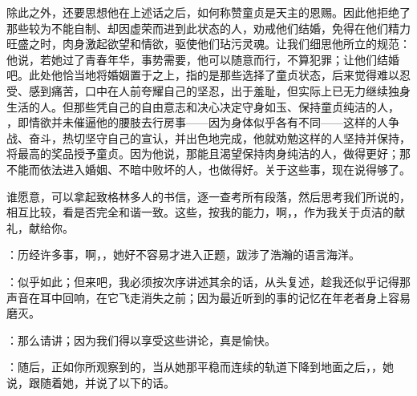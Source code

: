 除此之外，还要思想他在上述话之后，如何称赞童贞是天主的恩赐。因此他拒绝了那些较为不能自制、却因虚荣而进到此状态的人，劝戒他们结婚，免得在他们精力旺盛之时，肉身激起欲望和情欲，驱使他们玷污灵魂。让我们细思他所立的规范：他说，若她过了青春年华，事势需要，他可以随意而行，不算犯罪；让他们结婚吧。此处他恰当地将婚姻置于之上，指的是那些选择了童贞状态，后来觉得难以忍受、感到痛苦，口中在人前夸耀自己的坚忍，出于羞耻，但实际上已无力继续独身生活的人。但那些凭自己的自由意志和决心决定守身如玉、保持童贞纯洁的人，  ，即情欲并未催逼他的腰肢去行房事——因为身体似乎各有不同——这样的人争战、奋斗，热切坚守自己的宣认，并出色地完成，他就劝勉这样的人坚持并保持，将最高的奖品授予童贞。因为他说，那能且渴望保持肉身纯洁的人，做得更好；那不能而依法进入婚姻、不暗中败坏的人，也做得好。关于这些事，现在说得够了。\par

谁愿意，可以拿起致格林多人的书信，逐一查考所有段落，然后思考我们所说的，相互比较，看是否完全和谐一致。这些，按我的能力，啊，，作为我关于贞洁的献礼，献给你。\par

：历经许多事，啊，，她好不容易才进入正题，跋涉了浩瀚的语言海洋。\par

：似乎如此；但来吧，我必须按次序讲述其余的话，从头复述，趁我还似乎记得那声音在耳中回响，在它飞走消失之前；因为最近听到的事的记忆在年老者身上容易磨灭。\par

：那么请讲；因为我们得以享受这些讲论，真是愉快。\par

：随后，正如你所观察到的，当从她那平稳而连续的轨道下降到地面之后，，她说，跟随着她，并说了以下的话。\par



\section{}

